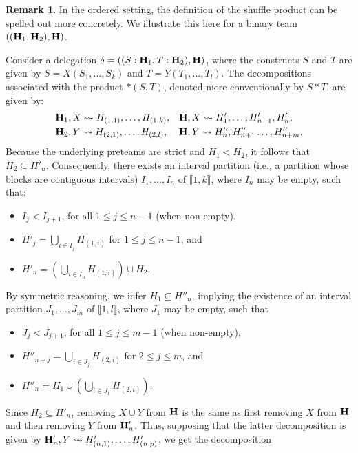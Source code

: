 \documentclass{article}
\theoremstyle{plain}
\theoremstyle{definition}
\newtheorem{remark}[thm]{Remark}
\newcommand{\hyper}[1]{{\bf #1}}
\begin{document}
\begin{remark}\label{rembin}
In the ordered setting, the definition of the shuffle product can be spelled out more concretely. We illustrate this here for a binary team $((\hyper{H}_1,\hyper{H}_2), \hyper{H})$.
 
\smallskip

Consider a delegation $\delta=((S:\hyper{H}_1, T:\hyper{H}_2), \hyper{H})$, where the constructs $S$ and $T$ are given by $S=X(S_1, \ldots ,S_k)$ and $T=Y(T_1, \ldots, T_l)$.
The decompositions associated with the product $\ast(S,T)$, denoted more conventionally by $S \ast T$, are given by:
\begin{align}\label{NotIJ}
 &\hyper{H}_1, X \leadsto H_{(1,1)}, \ldots, H_{(1,k)}, & &\hyper{H}, X\leadsto H'_{1}, \ldots, H'_{n-1}, H'_n, \\
 &\hyper{H}_2, Y \leadsto H_{(2,1)}, \ldots, H_{(2,l)},& 
 &\hyper{H}, Y \leadsto H''_{n}, H''_{n+1} \ldots, H''_{n+m}.
 \end{align}
Because the underlying preteams are strict and $H_1<H_2$, it follows that ${H}_2 \subseteq H'_n$. Consequently, there exists an interval partition (i.e., a partition whose blocks are contiguous intervals) $I_1, \ldots, I_n$ of $\llbracket 1, k\rrbracket$, where $I_n$ may be empty, such that:
\begin{itemize}
\item $I_j<I_{j+1}$, for all $1 \leq j \leq n-1$ (when non-empty),
\item $H'_j=\bigcup_{i \in I_j} H_{(1,i)}$ for $1 \leq j \leq n-1$, and
\item $H'_n=\left(\bigcup_{i \in I_n} H_{(1,i)}\right) \cup H_2$. 
\end{itemize}
By symmetric reasoning, we infer ${H}_1 \subseteq {H}''_n$, implying the existence of an interval partition $J_1, \ldots, J_m$ of $\llbracket 1, l\rrbracket$, where $J_1$ may be empty, such that 
\begin{itemize}
\item $J_j<J_{j+1}$, for all $1 \leq j \leq m-1$ (when non-empty),
\item $H''_{n+j}=\bigcup_{i \in J_j} H_{(2,i)}$ for $2 \leq j \leq m$, and 
\item $H''_n=H_1\cup \left(\bigcup_{i \in J_1} H_{(2,i)}\right)$. 
\end{itemize}
Since $H_2 \subseteq H'_n$, removing $X\cup Y$ from $\hyper{H}$ is the same as first removing $X$ from $\hyper{H}$ and then removing $Y$ from $\hyper{H}'_n$. Thus, supposing that the latter decomposition is given by $\hyper{H}'_n, Y \leadsto H'_{(n,1)}, \ldots, H'_{(n,p)}$, we get the decomposition 

\end{remark}
\end{document}
